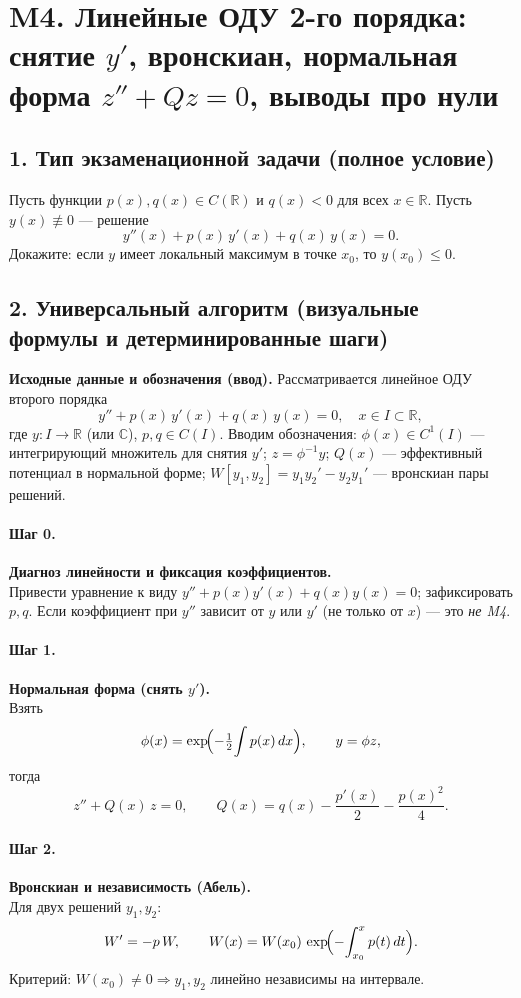 \section{M4. Линейные ОДУ 2-го порядка: снятие $y'$, вронскиан, нормальная форма $z''+Qz=0$, выводы про нули}

\subsection*{1. Тип экзаменационной задачи (полное условие)}
Пусть функции $p(x),q(x)\in C(\mathbb R)$ и $q(x)<0$ для всех $x\in\mathbb R$. Пусть $y(x)\not\equiv0$ — решение
\[
y''(x)+p(x)\,y'(x)+q(x)\,y(x)=0.
\]
Докажите: если $y$ имеет локальный максимум в точке $x_0$, то $y(x_0)\le 0$.

\subsection*{2. Универсальный алгоритм (визуальные формулы и детерминированные шаги)}

\textbf{Исходные данные и обозначения (ввод).}
Рассматривается линейное ОДУ второго порядка
\[
y''+p(x)\,y'(x)+q(x)\,y(x)=0,\quad x\in I\subset\mathbb R,
\]
где $y:I\to\mathbb R$ (или $\mathbb C$), $p,q\in C(I)$.
Вводим обозначения: $\phi(x)\in C^1(I)$ — интегрирующий множитель для снятия $y'$; $z=\phi^{-1}y$; $Q(x)$ — эффективный потенциал в нормальной форме; $W[y_1,y_2]=y_1y_2'-y_2y_1'$ — вронскиан пары решений.

\paragraph{Шаг 0.} \textbf{Диагноз линейности и фиксация коэффициентов.}\\
Привести уравнение к виду $y''+p(x)y'(x)+q(x)y(x)=0$; зафиксировать $p,q$.
Если коэффициент при $y''$ зависит от $y$ или $y'$ (не только от $x$) — это \emph{не M4}.

\paragraph{Шаг 1.} \textbf{Нормальная форма (снять $y'$).}\\
Взять
\[
\phi(x)=\exp\!\Bigl(-\tfrac12\!\int p(x)\,dx\Bigr),\qquad y=\phi z,
\]
тогда
\[
z''+Q(x)\,z=0,\qquad Q(x)=q(x)-\frac{p'(x)}{2}-\frac{p(x)^2}{4}.
\]

\paragraph{Шаг 2.} \textbf{Вронскиан и независимость (Абель).}\\
Для двух решений $y_1,y_2$:
\[
W'=-p\,W,\qquad W(x)=W(x_0)\,\exp\!\Bigl(-\!\int_{x_0}^{x}p(t)\,dt\Bigr).
\]
Критерий: $W(x_0)\neq0\Rightarrow y_1,y_2$ линейно независимы на интервале.

